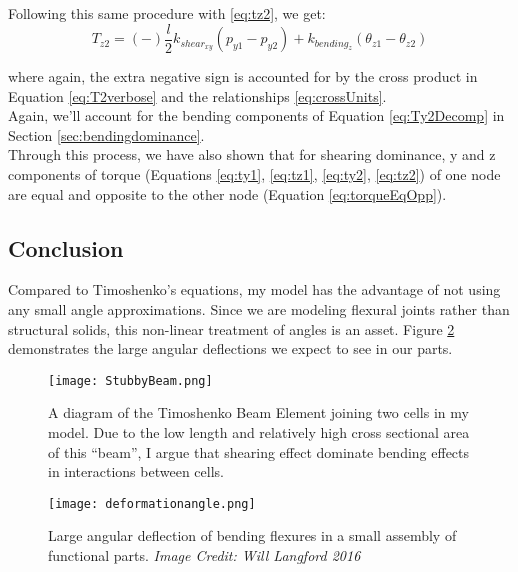 {Following this same procedure with \ref{eq:tz2}, we get:
\[  T_{z2} =  (-)\dfrac{l}{2}k_{shear_{xy}}(p_{y1} - p_{y2}) + k_{bending_z}(\theta_{z1}  - \theta_{z2}) \]

where again, the extra negative sign is accounted for by the cross product in Equation \ref{eq:T2verbose} and the relationships \ref{eq:crossUnits}.\\

Again, we'll account for the bending components of Equation \ref{eq:Ty2Decomp} in Section \ref{sec:bendingdominance}.\\

Through this process, we have also shown that for shearing dominance, y and z components of torque (Equations \ref{eq:ty1}, \ref{eq:tz1}, \ref{eq:ty2}, \ref{eq:tz2}) of one node are equal and opposite to the other node (Equation \ref{eq:torqueEqOpp}).

%

\subsection{Conclusion}

Compared to Timoshenko's equations, my model has the advantage of not using any small angle approximations.  Since we are modeling flexural joints rather than structural solids, this non-linear treatment of angles is an asset.  Figure \ref{fig:deformationangle} demonstrates the large angular deflections we expect to see in our parts.\\

\begin{figure}
  \texttt{[image: StubbyBeam.png]}
  \caption{A diagram of the Timoshenko Beam Element joining two cells in my model.  Due to the low length and relatively high cross sectional area of this ``beam'', I argue that shearing effect dominate bending effects in interactions between cells.}
  \label{fig:StubbyBeam}
\end{figure}

\begin{figure}
  \texttt{[image: deformationangle.png]}
  \caption{Large angular deflection of bending flexures in a small assembly of functional parts. \textit{Image Credit: Will Langford 2016}}
  \label{fig:deformationangle}
\end{figure}

}
